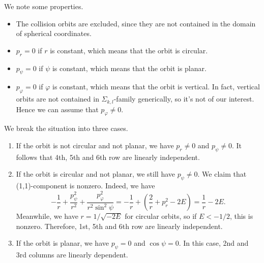 \documentclass{amsart}
\newcommand{\vp}{\varphi}
\begin{document}
We note some properties.
	\begin{itemize}
		\item The collision orbits are excluded, since they are not contained in the domain of spherical coordinates.
		\item $p_r=0$ if $r$ is constant, which means that the orbit is circular.
		\item $p_\psi=0$ if $\psi$ is constant, which means that the orbit is planar.
		\item $p_\vp=0$ if $\vp$ is constant, which means that the orbit is vertical.
		In fact, vertical orbits are not contained in $\Sigma_{k,l}$-family generically, so it's not of our interest.
		Hence we can assume that $p_\vp\neq0$.
	\end{itemize}
We break the situation into three cases.
	\begin{enumerate}
		\item If the orbit is not circular and not planar, we have $p_r\neq0$ and $p_\psi\neq0$.
		It follows that 4th, 5th and 6th row are linearly independent.
		\item If the orbit is circular and not planar, we still have $p_\psi\neq0$.
		We claim that (1,1)-component is nonzero.
		Indeed, we have
		$$
		-\frac{1}{r}+\frac{p_\psi^2}{r^2}+\frac{p_\vp^2}{r^2\sin^2\psi}=-\frac{1}{r} + \left(\frac{2}{r} + p_r^2 - 2E\right) = \frac{1}{r} - 2E.
		$$
		Meanwhile, we have $r=1/\sqrt{-2E}$ for circular orbits, so if $E<-1/2$, this is nonzero.	
		Therefore, 1st, 5th and 6th row are linearly independent.
		\item If the orbit is planar, we have $p_\psi=0$ and $\cos \psi=0$.
		In this case, 2nd and 3rd columns are linearly dependent.
	\end{enumerate}
\end{document}
